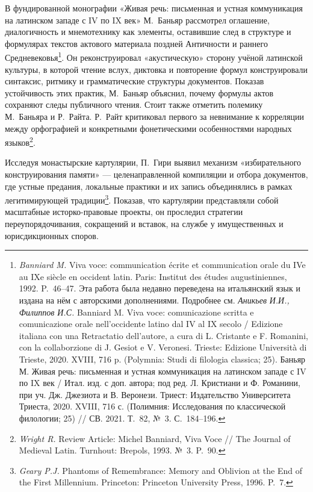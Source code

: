 В фундированной монографии «Живая речь: письменная и устная коммуникация на латинском западе с IV по IX век» М.~Баньяр рассмотрел оглашение, диалогичность и мнемотехнику как элементы, оставившие след в структуре и формулярах текстов актового материала поздней Античности и раннего Средневековья\footnote{\emph{Banniard M.} Viva voce: communication écrite et communication orale du IVe au IXe siècle en occident latin. Paris: Institut des études augustiniennes, 1992. P.~46--47. Эта работа была недавно переведена на итальянский язык и издана на нём с авторскими дополнениями. Подробнее см. \emph{Аникьев}\emph{ И.И., Филиппов И.С. }Banniard M. Viva voce: comunicazione scritta e comunicazione orale nell’occidente latino dal IV al IX secolo / Edizione italiana con una Retractatio dell’autore, a cura di L. Cristante e F. Romanini, con la collaborzione di J. Gesiot e V. Veronesi. Trieste: Edizione Università di Trieste, 2020. XVIII, 716 p. (Polymnia: Studi di filologia classica; 25). Баньяр М. Живая речь: письменная и устная коммуникация на латинском западе с IV по IX век / Итал. изд. с доп. автора; под ред. Л. Кристиани и Ф. Романини, при уч. Дж. Джезиота и В. Веронези. Триест: Издательство Университета Триеста, 2020. XVIII, 716 с. (Полимния: Исследования по классической филологии; 25) // СВ. 2021. Т.~82, №~3. С.~184--196.}. Он реконструировал «акустическую» сторону учёной латинской культуры, в которой чтение вслух, диктовка и повторение формул конструировали синтаксис, ритмику и грамматические структуры документов. Показав устойчивость этих практик, М.~Баньяр объяснил, почему формулы актов сохраняют следы публичного чтения. Стоит также отметить полемику М.~Баньяра и Р.~Райта. Р.~Райт критиковал первого за невнимание к корреляции между орфографией и конкретными фонетическими особенностями народных языков\footnote{\emph{Wright R.} Review Article: Michel Banniard, Viva Voce // The Journal of Medieval Latin. Turnhout: Brepols, 1993. №~3. P.~90.}.

Исследуя монастырские картулярии, П.~Гири выявил механизм «избирательного конструирования памяти» --- целенаправленной компиляции и отбора документов, где устные предания, локальные практики и их запись объединялись в рамках легитимирующей традиции\footnote{\emph{Geary P.J.} Phantoms of Remembrance: Memory and Oblivion at the End of the First Millennium. Princeton: Princeton University Press, 1996. P.~7.}. Показав, что картулярии представляли собой масштабные исторко-правовые проекты, он проследил стратегии переупорядочивания, сокращений и вставок, на службе у имущественных и юрисдикционных споров.

